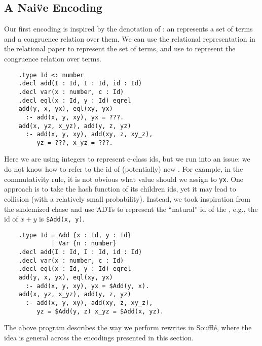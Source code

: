 \subsection{A Nai\"ve Encoding}\label{sec:naive}

Our first encoding is inspired by the denotation of \egraphs:
 an \egraph represents a set of terms and a congruence relation over them.
We can use the relational representation in the relational \ematching paper
 to represent the set of terms, 
 and use \eqrel{} to represent the congruence relation over terms.
\begin{verbatim}
    .type Id <: number
    .decl add(I : Id, I : Id, id : Id)
    .decl var(x : number, c : Id)
    .decl eql(x : Id, y : Id) eqrel
    add(y, x, yx), eql(xy, yx) 
      :- add(x, y, xy), yx = ???.
    add(x, yz, x_yz), add(y, z, yz) 
      :- add(x, y, xy), add(xy, z, xy_z), 
         yz = ???, x_yz = ???.
\end{verbatim}
Here we are using integers to represent e-class ids, 
 but we run into an issue:
 we do not know how to refer to the \eclass id
 of (potentially) new \eclasses.
For example,
 in the commutativity rule,
 it is not obvious what value should we assign to \verb|yx|.
One approach is to take the hash function of its children \eclass ids,
 yet it may lead to collision (with a relatively small probability).
Instead, we took inspiration from the skolemized chase \citep{bench-chase} and use ADTs 
 to represent the ``natural'' \eclass id of the \enode,
 e.g., the id of $x+y$ is \verb|$Add(x, y)|.
\begin{verbatim}
    .type Id = Add {x : Id, y : Id}
             | Var {n : number}
    .decl add(I : Id, I : Id, id : Id)
    .decl var(x : number, c : Id)
    .decl eql(x : Id, y : Id) eqrel
    add(y, x, yx), eql(xy, yx) 
      :- add(x, y, xy), yx = $Add(y, x).
    add(x, yz, x_yz), add(y, z, yz) 
      :- add(x, y, xy), add(xy, z, xy_z), 
         yz = $Add(y, z) x_yz = $Add(x, yz).
\end{verbatim}
The above program describes the way we perform rewrites in Souffl\'e,
 where the idea is general across the encodings presented in this section.

